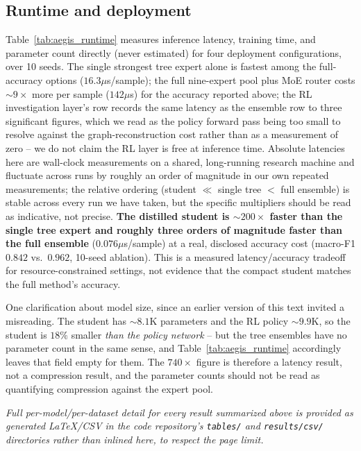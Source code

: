 \documentclass[journal]{IEEEtran}
\begin{document}


\subsection{Runtime and deployment}
Table~\ref{tab:aegis_runtime} measures inference latency, training time, and
parameter count directly (never estimated) for four deployment
configurations, over 10 seeds. The single strongest tree expert alone is
fastest among the full-accuracy options ($16.3\mu$s/sample); the full
nine-expert pool plus MoE router costs $\sim\!9\times$ more per sample
($142\mu$s) for the accuracy reported above; the RL investigation layer's row
records the same latency as the ensemble row to three significant figures,
which we read as the policy forward pass being too small to resolve against
the graph-reconstruction cost rather than as a measurement of zero -- we do
not claim the RL layer is free at inference time. Absolute latencies here are
wall-clock measurements on a shared, long-running research machine and
fluctuate across runs by roughly an order of magnitude in our own repeated
measurements; the relative ordering (student $\ll$ single tree $<$ full
ensemble) is stable across every run we have taken, but the specific
multipliers should be read as indicative, not precise. \textbf{The distilled
student is $\sim\!200\times$ faster than the single tree expert and roughly
three orders of magnitude faster than the full ensemble} ($0.076\mu$s/sample)
at a real, disclosed accuracy cost (macro-F1 $0.842$ vs.\ $0.962$, 10-seed
ablation). This is a measured latency/accuracy tradeoff for
resource-constrained settings, not evidence that the compact student matches
the full method's accuracy.

One clarification about model size, since an earlier version of this text
invited a misreading. The student has $\sim\!8.1$K parameters and the RL
policy $\sim\!9.9$K, so the student is $18\%$ smaller \emph{than the policy
network} -- but the tree ensembles have no parameter count in the same sense,
and Table~\ref{tab:aegis_runtime} accordingly leaves that field empty for
them. The $740\times$ figure is therefore a latency result, not a compression
result, and the parameter counts should not be read as quantifying
compression against the expert pool.

\emph{Full per-model/per-dataset detail for every result summarized above is
provided as generated LaTeX/CSV in the code repository's \texttt{tables/} and
\texttt{results/csv/} directories rather than inlined here, to respect the
page limit.}
\end{document}
